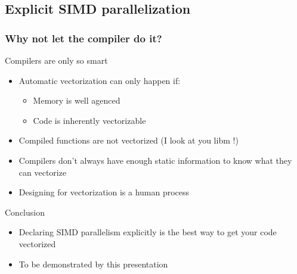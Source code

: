 \subsection{Explicit SIMD parallelization}
\frame
{
  \frametitle{Why not let the compiler do it?}
	
  \begin{block}{Compilers are only so smart}
  \footnotesize
   \begin{itemize}
		\footnotesize 
		\item Automatic vectorization can only happen if:
		\begin{itemize}
			\item Memory is well agenced
			\item Code is inherently vectorizable
		\end{itemize}
		\item Compiled functions are not vectorized (I look at you libm !)
		\item Compilers don't always have enough static information to know what they can vectorize
		\item Designing for vectorization is a human process
	\end{itemize}
	\end{block}{}
	\begin{block}{Conclusion}
	\begin{itemize}
\footnotesize
		\item Declaring SIMD parallelism explicitly is the best way
              to get your code vectorized
        \item To be demonstrated by this presentation
    \end{itemize}
\end{block}{}
}

